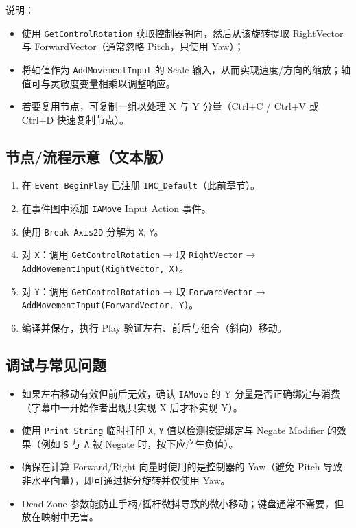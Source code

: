 \documentclass[10pt,CJKmath]{zhbook-v1}
\newcommand{\il}[1]{\texttt{#1}}%
\begin{document}
说明：
\begin{itemize}
  \item 使用 \il{GetControlRotation} 获取控制器朝向，然后从该旋转提取 RightVector 与 ForwardVector（通常忽略 Pitch，只使用 Yaw）；
  \item 将轴值作为 \il{AddMovementInput} 的 Scale 输入，从而实现速度/方向的缩放；轴值可与灵敏度变量相乘以调整响应。
  \item 若要复用节点，可复制一组以处理 X 与 Y 分量（Ctrl+C / Ctrl+V 或 Ctrl+D 快速复制节点）。
\end{itemize}

\subsection{节点/流程示意（文本版）}
\begin{enumerate}
  \item 在 \il{Event BeginPlay} 已注册 \il{IMC_Default}（此前章节）。
  \item 在事件图中添加 \il{IAMove} Input Action 事件。
  \item 使用 \il{Break Axis2D} 分解为 \il{X}, \il{Y}。
  \item 对 \il{X}：调用 \il{GetControlRotation} → 取 \il{RightVector} → \il{AddMovementInput(RightVector, X)}。
  \item 对 \il{Y}：调用 \il{GetControlRotation} → 取 \il{ForwardVector} → \il{AddMovementInput(ForwardVector, Y)}。
  \item 编译并保存，执行 Play 验证左右、前后与组合（斜向）移动。
\end{enumerate}

\subsection{调试与常见问题}
\begin{itemize}
  \item 如果左右移动有效但前后无效，确认 \il{IAMove} 的 Y 分量是否正确绑定与消费（字幕中一开始作者出现只实现 X 后才补实现 Y）。
  \item 使用 \il{Print String} 临时打印 \il{X}, \il{Y} 值以检测按键绑定与 Negate Modifier 的效果（例如 \il{S} 与 \il{A} 被 Negate 时，按下应产生负值）。
  \item 确保在计算 Forward/Right 向量时使用的是控制器的 Yaw（避免 Pitch 导致非水平向量），即可通过拆分旋转并仅使用 Yaw。
  \item Dead Zone 参数能防止手柄/摇杆微抖导致的微小移动；键盘通常不需要，但放在映射中无害。
\end{itemize}
\end{document}
